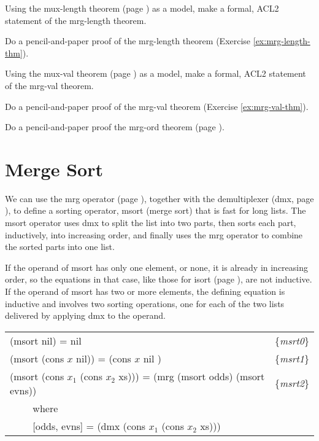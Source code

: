 \begin{ExerciseList}
\Exercise
\label{ex:mrg-length-thm}
Using the mux-length theorem (page \pageref{mux-length-thm})
as a model, make a formal, ACL2 statement of the mrg-length theorem.

\Exercise
Do a pencil-and-paper proof of the mrg-length theorem (Exercise \ref{ex:mrg-length-thm}).

\Exercise
\label{ex:mrg-val-thm}
Using the mux-val theorem (page \pageref{thm:mux-val})
as a model, make a formal, ACL2 statement of the mrg-val theorem.

\Exercise
Do a pencil-and-paper proof of the mrg-val theorem (Exercise \ref{ex:mrg-val-thm}).

\Exercise
Do a pencil-and-paper proof the mrg-ord theorem (page \pageref{defthm:mrg-ord}).
\end{ExerciseList}

\section{Merge Sort}
\label{sec:msort}

We can use the mrg operator (page \pageref{defun:mrg}),
together with the demultiplexer (dmx, page \pageref{dmx-defun}),
to define a sorting operator, msort (merge sort) that is fast for long lists.
The msort operator uses dmx to split the list into two parts,
then sorts each part, inductively, into increasing order, and finally
uses the mrg operator to combine the sorted parts into one list.

If the operand of msort has only one element, or none,
it is already in increasing order,
so the equations in that case,
like those for isort (page \pageref{eq:isrt0}),
are not inductive.
If the operand of msort has two or more elements,
the defining equation is inductive and
involves two sorting operations,
one for each of the two lists delivered by applying
dmx to the operand.

\begin{center}
\label{eq:msrt1}
\label{eq:msrt0}
\label{eq:msrt2}
\begin{tabular}{ll}
(msort nil) = nil                        & \{\emph{msrt0}\} \\
(msort (cons $x$ nil)) = (cons $x$ nil ) & \{\emph{msrt1}\} \\
(msort (cons $x_1$ (cons $x_2$ xs))) = (mrg (msort odds) (msort evns)) & \{\emph{msrt2}\} \\
 ~~~~ where  & \\
 ~~~~ [odds, evns] = (dmx (cons $x_1$ (cons $x_2$ xs))) & \\
\end{tabular}
\end{center}

